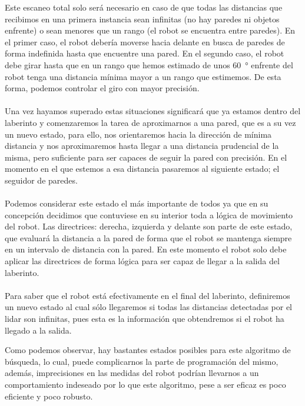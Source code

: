 \documentclass[a4paper,9pt]{article}
\begin{document}
Este escaneo total solo será necesario en caso de que todas las distancias que recibimos en una primera instancia sean infinitas (no hay paredes ni objetos enfrente) o sean menores que un rango (el robot se encuentra entre paredes). En el primer caso, el robot debería moverse hacia delante en busca de paredes de forma indefinida hasta que encuentre una pared. En el segundo caso, el robot debe girar hasta que en un rango que hemos estimado de unos \SI{60}{\degree} enfrente del robot tenga una distancia mínima mayor a un rango que estimemos. De esta forma, podemos controlar el giro con mayor precisión.

\paragraph{}

Una vez hayamos superado estas situaciones significará que ya estamos dentro del laberinto y comenzaremos la tarea de aproximarnos a una pared, que es a su vez un nuevo estado, para ello, nos orientaremos hacia la dirección de mínima distancia y nos aproximaremos hasta llegar a una distancia prudencial de la misma, pero suficiente para ser capaces de seguir la pared con precisión. En el momento en el que estemos a esa distancia pasaremos al siguiente estado; el seguidor de paredes.
\paragraph{}
Podemos considerar este estado el más importante de todos ya que en su concepción decidimos que contuviese en su interior toda a lógica de movimiento del robot. Las directrices: derecha, izquierda y delante son parte de este estado, que evaluará la distancia a la pared de forma que el robot se mantenga siempre en un intervalo de distancia con la pared. En este momento el robot solo debe aplicar las directrices de forma lógica para ser capaz de llegar a la salida del laberinto.
\paragraph{}
Para saber que el robot está efectivamente en el final del laberinto, definiremos un nuevo estado al cual sólo llegaremos si todas las distancias detectadas por el lidar son infinitas, pues esta es la información que obtendremos si el robot ha llegado a la salida.

Como podemos observar, hay bastantes estados posibles para este algoritmo de búsqueda, lo cual, puede complicarnos la parte de programación del mismo, además, imprecisiones en las medidas del robot podrían llevarnos a un comportamiento indeseado por lo que este algoritmo, pese a ser eficaz es poco eficiente y poco robusto. 
\end{document}
